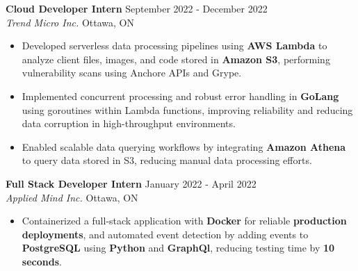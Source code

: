 \documentclass[a4paper]{article}
\begin{document}
\textbf{Cloud Developer Intern} \hfill September 2022 - December 2022\\
\textit{Trend Micro Inc.} \hfill Ottawa, ON\\
\vspace{-2mm}
\begin{itemize} \itemsep -4pt

\item Developed serverless data processing pipelines using \textbf{AWS Lambda} to analyze client files, images, and code stored in \textbf{Amazon S3}, performing vulnerability scans using Anchore APIs and Grype.

\item Implemented concurrent processing and robust error handling in \textbf{GoLang} using goroutines within Lambda functions, improving reliability and reducing data corruption in high-throughput environments.

\item Enabled scalable data querying workflows by integrating \textbf{Amazon Athena} to query data stored in S3, reducing manual data processing efforts.

\end{itemize}

\textbf{Full Stack Developer Intern} \hfill January 2022 - April 2022\\
\textit{Applied Mind Inc.} \hfill Ottawa, ON\\
\vspace{-2mm}
\begin{itemize} \itemsep -4pt
\item Containerized a full-stack application with \textbf{Docker} for reliable \textbf{production deployments}, and automated event detection by adding events to \textbf{PostgreSQL} using \textbf{Python} and \textbf{GraphQl}, reducing testing time by \textbf{10 seconds}.
\end{itemize}

\vspace{5mm}
\vspace*{-1mm}
\vspace*{5mm}
\end{document}
